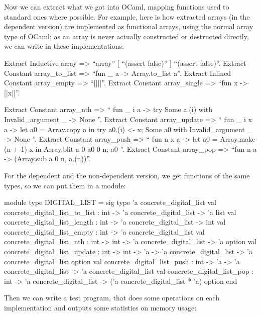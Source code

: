 \documentclass{article}
\begin{document}
Now we can extract what we got into OCaml, mapping functions used to standard ones where possible. For example, here is how extracted arrays (in the dependent version) are implemented as functional arrays, using the normal array type of OCaml; as an array is never actually constructed or destructed directly, we can write  in these implementations:

\begin{coq}
Extract Inductive array => ``array'' [ ``(assert false)'' ] ``(assert false)''.
Extract Constant array_to_list => ``fun _ a -> Array.to_list a''.
Extract Inlined Constant array_empty => ``[||]''.
Extract Constant array_single => ``fun x -> [|x|]''.
\end{coq}
\pagebreak%
\begin{coq}
Extract Constant array_nth => ``
  fun _ i a ->
    try Some a.(i)
    with Invalid_argument _ -> None
''.
Extract Constant array_update => ``
  fun _ i x a ->
    let a0 = Array.copy a in
    try
      a0.(i) <- x;
      Some a0
    with Invalid_argument _ -> None
''.
Extract Constant array_push => ``
  fun n x a ->
    let a0 = Array.make (n + 1) x in
    Array.blit a 0 a0 0 n;
    a0
''.
Extract Constant array_pop => ``fun n a -> (Array.sub a 0 n, a.(n))''.
\end{coq}

For the dependent and the non-dependent version, we get functions of the same types, so we can put them in a module:

\begin{coq}
module type DIGITAL_LIST = sig
  type 'a concrete_digital_list
  val concrete_digital_list_to_list : int -> 'a concrete_digital_list -> 'a list
  val concrete_digital_list_length : int -> 'a concrete_digital_list -> int
  val concrete_digital_list_empty : int -> 'a concrete_digital_list
  val concrete_digital_list_nth : int -> int -> 'a concrete_digital_list -> 'a option
  val concrete_digital_list_update :
    int -> int -> 'a -> 'a concrete_digital_list -> 'a concrete_digital_list option
  val concrete_digital_list_push : int -> 'a -> 'a concrete_digital_list -> 'a concrete_digital_list
  val concrete_digital_list_pop : int -> 'a concrete_digital_list -> ('a concrete_digital_list * 'a) option
end
\end{coq}

Then we can write a test program, that does some operations on each implementation and outputs some statistics on memory usage:
\end{document}
